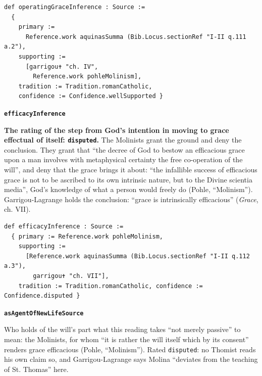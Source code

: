\documentclass[11pt]{article}
\begin{document}
{\small\begin{verbatim}
def operatingGraceInference : Source :=
  {
    primary :=
      Reference.work aquinasSumma (Bib.Locus.sectionRef "I-II q.111 a.2"),
    supporting :=
      [garrigou✝ "ch. IV",
        Reference.work pohleMolinism],
    tradition := Tradition.romanCatholic,
    confidence := Confidence.wellSupported }
\end{verbatim}}
\par\medskip\noindent\textbf{\texttt{efficacy\allowbreak{}Inference}}\par\nobreak\noindent
\textbf{The rating of the step from God’s intention in moving to grace effectual of itself: \texttt{disputed}.} The Molinists grant the ground and deny the conclusion. They grant that “the decree of God to bestow an efficacious grace upon a man involves with metaphysical certainty the free co-operation of the will”, and deny that the grace brings it about: “the infallible success of efficacious grace is not to be ascribed to its own intrinsic nature, but to the Divine scientia media”, God’s knowledge of what a person would freely do (Pohle, “Molinism”). Garrigou-Lagrange holds the conclusion: “grace is intrinsically efficacious” (\emph{Grace}, ch. VII).

{\small\begin{verbatim}
def efficacyInference : Source :=
  { primary := Reference.work pohleMolinism,
    supporting :=
      [Reference.work aquinasSumma (Bib.Locus.sectionRef "I-II q.112 a.3"),
        garrigou✝ "ch. VII"],
    tradition := Tradition.romanCatholic, confidence := Confidence.disputed }
\end{verbatim}}
\par\medskip\noindent\textbf{\texttt{as\allowbreak{}Agent\allowbreak{}Of\allowbreak{}New\allowbreak{}Life\allowbreak{}Source}}\par\nobreak\noindent
Who holds of the will’s part what this reading takes “not merely passive” to mean: the Molinists, for whom “it is rather the will itself which by its consent” renders grace efficacious (Pohle, “Molinism”). Rated \texttt{disputed}: no Thomist reads his own claim so, and Garrigou-Lagrange says Molina “deviates from the teaching of St. Thomas” here.
\end{document}
